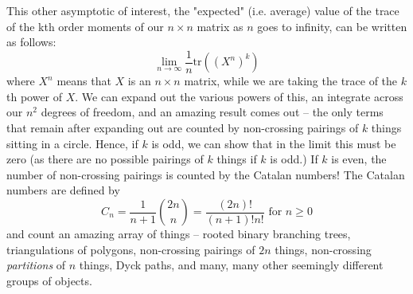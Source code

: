  \vspace{0.2cm}


This other asymptotic of interest, the "expected" (i.e. average) value of the trace of the kth order moments of our $n \times n$ matrix as $n$ goes to infinity, can be written as follows:
\[
\lim_{n \to \infty} \frac{1}{n} \text{tr}\left( (X^n)^k\right)
\]
where $X^n$ means that $X$ is an $n \times n$ matrix, while we are taking the trace of the $k$th power of $X$. We can expand out the various powers of this, an integrate across our $n^2$ degrees of freedom, and an amazing result comes out -- the only terms that remain after expanding out are counted by non-crossing pairings of $k$ things sitting in a circle. Hence, if $k$ is odd, we can show that in the limit this must be zero (as there are no possible pairings of $k$ things if $k$ is odd.) If $k$ is even, the number of non-crossing pairings is counted by the Catalan numbers! The Catalan numbers are defined by 
\[
C_n= \frac{1}{n+1} \binom{2n}{n} = \frac{(2n)!}{(n+1)!n!} \text{ for }n \geq 0
\]
and count an amazing array of things -- rooted binary branching trees, triangulations of polygons, non-crossing pairings of $2n$ things, non-crossing \emph{partitions} of $n$ things, Dyck paths, and many, many other seemingly different groups of objects. \\

